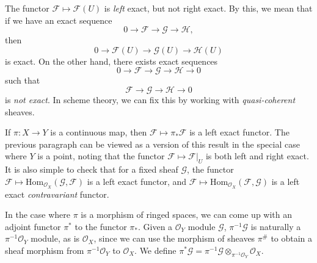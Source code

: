 The functor $\mathcal{F} \mapsto \mathcal{F}(U)$ is \emph{left} exact, but not right exact. By this, we mean that if we have an exact sequence
%
\[ 0 \to \mathcal{F} \to \mathcal{G} \to \mathcal{H}, \]
%
then
%
\[ 0 \to \mathcal{F}(U) \to \mathcal{G}(U) \to \mathcal{H}(U) \]
%
is exact. On the other hand, there exists exact sequences
%
\[ 0 \to \mathcal{F} \to \mathcal{G} \to \mathcal{H} \to 0 \]
%
such that
%
\[ \mathcal{F} \to \mathcal{G} \to \mathcal{H} \to 0 \]
%
is \emph{not exact}. In scheme theory, we can fix this by working with \emph{quasi-coherent} sheaves.

If $\pi: X \to Y$ is a continuous map, then $\mathcal{F} \mapsto \pi_* \mathcal{F}$ is a left exact functor. The previous paragraph can be viewed as a version of this result in the special case where $Y$ is a point, noting that the functor $\mathcal{F} \mapsto \mathcal{F}|_U$ is both left and right exact. It is also simple to check that for a fixed sheaf $\mathcal{G}$, the functor $\mathcal{F} \mapsto \text{Hom}_{\mathcal{O}_X}(\mathcal{G},\mathcal{F})$ is a left exact functor, and $\mathcal{F} \mapsto \text{Hom}_{\mathcal{O}_X}(\mathcal{F},\mathcal{G})$ is a left exact \emph{contravariant} functor.

In the case where $\pi$ is a morphism of ringed spaces, we can come up with an adjoint functor $\pi^*$ to the functor $\pi_*$. Given a $\mathcal{O}_Y$ module $\mathcal{G}$, $\pi^{-1} \mathcal{G}$ is naturally a $\pi^{-1} \mathcal{O}_Y$ module, as is $\mathcal{O}_X$, since we can use the morphism of sheaves $\pi^\#$ to obtain a sheaf morphism from $\pi^{-1} \mathcal{O}_Y$ to $\mathcal{O}_X$. We define $\pi^* \mathcal{G} = \pi^{-1} \mathcal{G} \otimes_{\pi^{-1} \mathcal{O}_Y} \mathcal{O}_X$.

